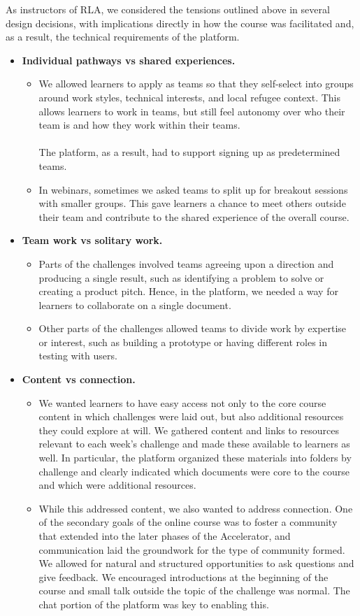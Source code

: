 \documentclass[12pt,twoside]{mitthesis}
\newcommand{\draft}[1]{{\color{blue} #1}}
\begin{document}
\draft{As instructors of RLA, we considered the tensions outlined above in several design decisions, with implications directly in how the course was facilitated and, as a result, the technical requirements of the platform.

\begin{itemize}
\item \textbf{Individual pathways vs shared experiences.}
\begin{itemize}
	\item We allowed learners to apply as teams so that they self-select into groups around work styles, technical interests, and local refugee context. This allows learners to work in teams, but still feel autonomy over who their team is and how they work within their teams.\\ \\The platform, as a result, had to support signing up as predetermined teams.
	\item In webinars, sometimes we asked teams to split up for breakout sessions with smaller groups. This gave learners a chance to meet others outside their team and contribute to the shared experience of the overall course.
\end{itemize}
\item \textbf{Team work vs solitary work.}
\begin{itemize}
	\item Parts of the challenges involved teams agreeing upon a direction and producing a single result, such as identifying a problem to solve or creating a product pitch. Hence, in the platform, we needed a way for learners to collaborate on a single document.
	\item Other parts of the challenges allowed teams to divide work by expertise or interest, such as building a prototype or having different roles in testing with users.
\end{itemize}
\item \textbf{Content vs connection.} 
\begin{itemize}
	\item We wanted learners to have easy access not only to the core course content in which challenges were laid out, but also additional resources they could explore at will. We gathered content and links to resources relevant to each week's challenge and made these available to learners as well. In particular, the platform organized these materials into folders by challenge and clearly indicated which documents were core to the course and which were additional resources.
	\item While this addressed content, we also wanted to address connection. One of the secondary goals of the online course was to foster a community that extended into the later phases of the Accelerator, and communication laid the groundwork for the type of community formed. We allowed for natural and structured opportunities to ask questions and give feedback. We encouraged introductions at the beginning of the course and small talk outside the topic of the challenge was normal. The chat portion of the platform was key to enabling this.
\end{itemize}
\end{itemize}

}
\end{document}
